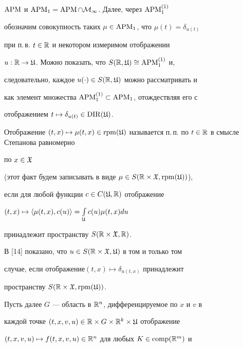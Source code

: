 $\operatorname{APM}$ и $\operatorname{APM}_1= \operatorname{APM}\cap\cal M_1$. Далее, через $\operatorname{APM}_1^{(1)}$


обозначим совокупность таких $\mu\in \operatorname{APM}_1$, что $\mu(t)=\delta_{u(t)}$


при п.\,в. $t\in\Bbb R$ и некотором измеримом отображении


$u:\Bbb R\to\frak U$. Можно показать, что $S(\Bbb R,\frak U)\cong \operatorname{APM}_1^{(1)}$ и,


следовательно, каждое $u(\cdot)\in S(\Bbb R,\frak U)$ можно рассматривать и


как элемент множества $\operatorname{APM}_1^{(1)}\subset \operatorname{APM}_1$, отождествляя его с


отображением $t\mapsto \delta_{u(t)}\in \operatorname{DIR}(\frak U)$.





\begin{defns}


Отображение $(t,x)\mapsto\mu(t,x)


\in\rpm(\gU)$ называется п.\,п. по $t\in\R$ в смысле Степанова равномерно


по $x\in\frak X$


(этот факт будем записывать в виде $\mu\in S(\Bbb R\times\frak X,\operatorname{rpm}(\frak U))$),


если для любой функции $c\in C(\frak U,\Bbb R)$ отображение


$(t,x)\mapsto\langle\mu(t,x),c(u)\rangle=\int\limits_{\frak U}c(u)\mu(t,x)du$


принадлежит пространству $S(\Bbb R\times\frak X,\Bbb R)$.


\end{defns}





В [14] показано, что $u\in S(\Bbb R\times\frak X,\frak U)$ в том и только том


случае, если отображение\linebreak $(t,x)\mapsto\delta_{u(t,x)}$ принадлежит


пространству $S(\Bbb R\times\frak X,\operatorname{rpm}(\frak U))$.





Пусть далее $G$ --- область в $\Bbb R^{n}$, дифференцируемое по $x$ и $v$ в


каждой точке $(t,x,v,u)\in\linebreak


\R\times G\times\R^{k}\times\gU$ отображение


$(t,x,v,u)\mapsto f(t,x,v,u)\in\Bbb R^{n}$ для любых $K\in \operatorname{comp}(\Bbb R^{m})$ и


